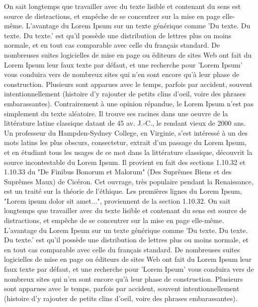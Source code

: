 \documentclass{article}
\begin{document}
\beginnumbering
\pstart
On sait  longtemps que travailler avec du texte lisible et contenant du sens est source de distractions, et empêche de se concentrer sur la mise en page elle-même. L'avantage du Lorem Ipsum sur un texte générique comme 'Du texte. Du texte. Du texte.' est qu'il possède une distribution de lettres plus ou moins normale, et en tout cas comparable avec celle du français standard. De nombreuses suites logicielles de mise en page ou éditeurs de sites Web ont fait du Lorem Ipsum leur faux texte par défaut, et une recherche pour 'Lorem Ipsum' vous conduira vers de nombreux sites qui n'en sont encore qu'à leur phase de construction. Plusieurs  sont apparues avec le temps, parfois par accident, souvent intentionnellement (histoire d'y rajouter de petits clins d'oeil, voire des phrases embarassantes).
\pend
\pstart
Contrairement à une opinion répandue, le Lorem Ipsum n'est pas simplement du texte aléatoire. Il trouve ses racines dans une oeuvre de la littérature latine classique datant de 45 av. J.-C., le rendant vieux de 2000 ans. Un professeur du Hampden-Sydney College, en Virginie, s'est intéressé à un des mots latins les plus obscurs, consectetur, extrait d'un passage du Lorem Ipsum, et en étudiant tous les usages de ce mot dans la littérature classique, découvrit la source incontestable du Lorem Ipsum. Il provient en fait des sections 1.10.32 et 1.10.33 du "De Finibus Bonorum et Malorum" (Des Suprêmes Biens et des Suprêmes Maux) de Cicéron. Cet ouvrage, très populaire pendant la Renaissance, est un traité sur la théorie de l'éthique. Les premières lignes du Lorem Ipsum, "Lorem ipsum dolor sit amet...", proviennent de la section 1.10.32.
\pend
\pstart
On sait  longtemps que travailler avec du texte lisible et contenant du sens est source de distractions, et empêche de se concentrer sur la mise en page elle-même. L'avantage du Lorem Ipsum sur un texte générique comme 'Du texte. Du texte. Du texte.' est qu'il possède une distribution de lettres plus ou moins normale, et en tout cas comparable avec celle du français standard. De nombreuses suites logicielles de mise en page ou éditeurs de sites Web ont fait du Lorem Ipsum leur faux texte par défaut, et une recherche pour 'Lorem Ipsum' vous conduira vers de nombreux sites qui n'en sont encore qu'à leur phase de construction. Plusieurs  sont apparues avec le temps, parfois par accident, souvent intentionnellement (histoire d'y rajouter de petits clins d'oeil, voire des phrases embarassantes).
\end{document}
